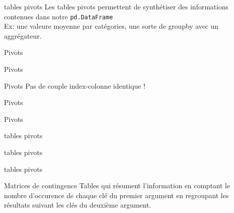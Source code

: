 \begin{frame}{tables pivots}
  Les tables pivots permettent de synthétiser des informations contenues dans notre \texttt{pd.DataFrame} \\
  Ex: une valeure moyenne par catégories, une sorte de groupby avec un aggrégateur.
\end{frame}

\begin{frame}{Pivots}
\end{frame}

\begin{frame}{Pivots}
\end{frame}

\begin{frame}{Pivots}
  Pas de couple index-colonne identique !
\end{frame}

\begin{frame}{Pivots}
\end{frame}

\begin{frame}{Pivots}
\end{frame}


\begin{frame}{tables pivots}
\end{frame}

\begin{frame}{tables pivots}
\end{frame}

\begin{frame}{tables pivots}
\end{frame}

\begin{frame}{Matrices de contingence}
  Tables qui résument l'information en comptant le nombre d'occurence de chaque clé
  du premier argument en regroupant les résultats suivant les clés du deuxième argument. \\
\end{frame}
